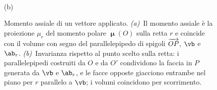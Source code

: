\begin{figure}[!htbp]
\begin{minipage}[b]{0.54\linewidth}
\begin{tikzpicture}
		\end{tikzpicture}\\[4pt]
		{\small (b)}
	\end{minipage}
	\caption[Momento assiale di un vettore applicato]{Momento assiale
		di un vettore applicato.
		\textit{(a)}~Il momento assiale è la proiezione $\mu_r$ del momento
		polare $\bm{\upmu}(O)$ sulla retta $r$ e coincide con il volume con
		segno del parallelepipedo di spigoli $\protect\overrightarrow{OP}$,
		$\vb$ e $\ab_r$.
		\textit{(b)}~Invarianza rispetto al punto scelto sulla retta: i
		parallelepipedi costruiti da $O$ e da $O'$ condividono la faccia
		in $P$ generata da $\vb$ e $\ab_r$, e le facce opposte giacciono
		entrambe nel piano per $r$ parallelo a $\vb$; i volumi coincidono
		per scorrimento.}
	\label{f:momento_assiale}
\end{figure}
